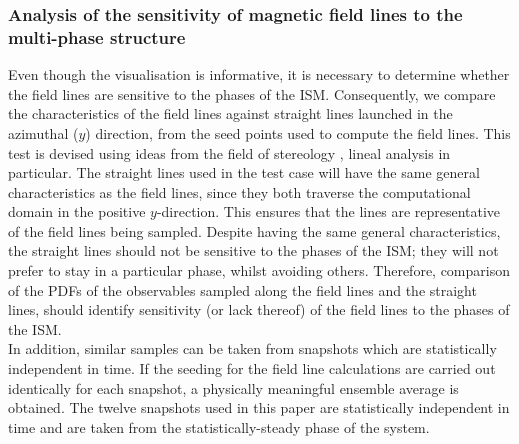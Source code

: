 \documentclass[useAMS,usenatbib]{mn2e}
\begin{document}
\subsubsection{Analysis of the sensitivity of magnetic field lines to the multi-phase structure}
Even though the visualisation is informative, it is necessary to determine whether the field lines are sensitive to the phases of the ISM. Consequently, we compare the characteristics of the field lines against straight lines launched in the azimuthal ($y$) direction, from the seed points used to compute the field lines. This test is devised using ideas from the field of stereology \citep{BJ04}, lineal analysis in particular. The straight lines used in the test case will have the same general characteristics as the field lines, since they both traverse the computational domain in the positive $y$-direction. This ensures that the lines are representative of the field lines being sampled. Despite having the same general characteristics, the straight lines should not be sensitive to the phases of the ISM; they will not prefer to stay in a particular phase, whilst avoiding others. Therefore, comparison of the PDFs of the observables sampled along the field lines and the straight lines, should identify sensitivity (or lack thereof) of the field lines to the phases of the ISM.\\
In addition, similar samples can be taken from snapshots which are statistically independent in time. If the seeding for the field line calculations are carried out identically for each snapshot, a physically meaningful ensemble average is obtained. The twelve snapshots used in this paper are statistically independent in time and are taken from the statistically-steady phase of the system.
\end{document}
